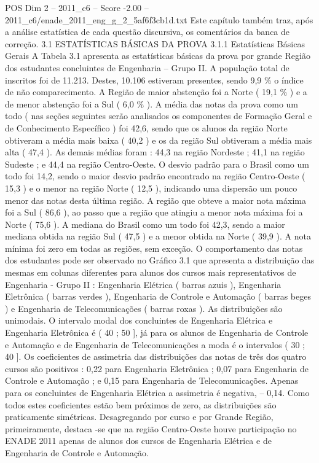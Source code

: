 \begin{textsample}{POS Dim 2 – 2011\_c6 – Score -2.00 – 2011\_c6/enade\_2011\_eng\_g\_2\_5af6f3cb1d.txt}
Este capítulo também traz, após a análise estatística de cada questão discursiva, os comentários da banca de correção. 3.1 ESTATÍSTICAS BÁSICAS DA PROVA 3.1.1 Estatísticas Básicas Gerais A Tabela 3.1 apresenta as estatísticas básicas da prova por grande Região dos estudantes concluintes de Engenharia – Grupo II.
A população total de inscritos foi de 11.213.
Destes, 10.106 estiveram presentes, sendo 9,9 \% o índice de não comparecimento.
A Região de maior abstenção foi a Norte ( 19,1 \% ) e a de menor abstenção foi a Sul ( 6,0 \% ).
A média das notas da prova como um todo ( nas seções seguintes serão analisados os componentes de Formação Geral e de Conhecimento Específico ) foi 42,6, sendo que os alunos da região Norte obtiveram a média mais baixa ( 40,2 ) e os da região Sul obtiveram a média mais alta ( 47,4 ).
As demais médias foram : 44,3 na região Nordeste ; 41,1 na região Sudeste ; e 44,4 na região Centro-Oeste.
O desvio padrão para o Brasil como um todo foi 14,2, sendo o maior desvio padrão encontrado na região Centro-Oeste ( 15,3 ) e o menor na região Norte ( 12,5 ), indicando uma dispersão um pouco menor das notas desta última região.
A região que obteve a maior nota máxima foi a Sul ( 86,6 ), ao passo que a região que atingiu a menor nota máxima foi a Norte ( 75,6 ).
A mediana do Brasil como um todo foi 42,3, sendo a maior mediana obtida na região Sul ( 47,5 ) e a menor obtida na Norte ( 39,9 ).
A nota mínima foi zero em todas as regiões, sem exceção.
O comportamento das notas dos estudantes pode ser observado no Gráfico 3.1 que apresenta a distribuição das mesmas em colunas diferentes para alunos dos cursos mais representativos de Engenharia - Grupo II : Engenharia Elétrica ( barras azuis ), Engenharia Eletrônica ( barras verdes ), Engenharia de Controle e Automação ( barras beges ) e Engenharia de Telecomunicações ( barras roxas ).
As distribuições são unimodais.
O intervalo modal dos concluintes de Engenharia Elétrica e Engenharia Eletrônica é ( 40 ; 50 ], já para os alunos de Engenharia de Controle e Automação e de Engenharia de Telecomunicações a moda é o intervalos ( 30 ; 40 ].
Os coeficientes de assimetria das distribuições das notas de três dos quatro cursos são positivos : 0,22 para Engenharia Eletrônica ; 0,07 para Engenharia de Controle e Automação ; e 0,15 para Engenharia de Telecomunicações.
Apenas para os concluintes de Engenharia Elétrica a assimetria é negativa, – 0,14.
Como todos estes coeficientes estão bem próximos de zero, as distribuições são praticamente simétricas.
Desagregando por curso e por Grande Região, primeiramente, destaca -se que na região Centro-Oeste houve participação no ENADE 2011 apenas de alunos dos cursos de Engenharia Elétrica e de Engenharia de Controle e Automação.

\end{textsample}
